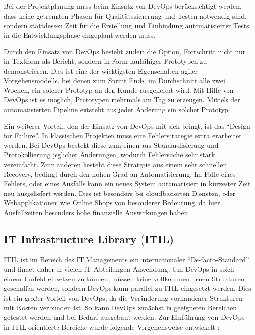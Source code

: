 Bei der Projektplanung muss beim Einsatz von DevOps berücksichtigt werden, dass keine getrennten Phasen für Qualitätssicherung und Testen notwendig sind, sondern stattdessen Zeit für die Erstellung und Einbindung automatisierter Tests in die Entwicklungsphase eingeplant werden muss. \parencite[Vgl.][S. 2]{Null:2014}

Durch den Einsatz von DevOps besteht zudem die Option, Fortschritt nicht nur in Textform als Bericht, sondern in Form lauffähiger Prototypen zu demonstrieren. 
Dies ist eine der wichtigsten Eigenschaften agiler Vorgehensmodelle, bei denen zum Sprint Ende, im Durchschnitt alle zwei Wochen, ein solcher Prototyp an den Kunde ausgeliefert wird. 
Mit Hilfe von DevOps ist es möglich, Prototypen mehrmals am Tag zu erzeugen. Mittels der automatisierten Pipeline entsteht aus jeder Änderung ein solcher Prototyp. \parencite[Vgl.][S. 3]{Null:2014}

Ein weiterer Vorteil, den der Einsatz von DevOps mit sich bringt, ist das \enquote{Design for Failure}. 
In klassischen Projekten muss eine Fehlerstrategie extra erarbeitet werden. Bei DevOps besteht diese zum einen aus Standardisierung und Protokollierung jeglicher Änderungen, wodurch Fehlersuche sehr stark vereinfacht. 
Zum anderen besteht diese Strategie aus einem sehr schnellen Recovery, bedingt durch den hohen Grad an Automatisierung. 
Im Falle eines Fehlers, oder eines Ausfalls kann ein neues System automatisiert in kürzester Zeit neu ausgeliefert werden. 
Dies ist besonders bei cloudbasierten Diensten, oder Webapplikationen wie Online Shops von besonderer Bedeutung, da hier Ausfallzeiten besonders hohe finanzielle Auswirkungen haben. 
\parencite[Vgl.][S. 3 - 4]{Null:2014}

\subsection{IT Infrastructure Library (ITIL)}
ITIL ist im Bereich des IT Managements ein internationaler \enquote{De-facto-Standard} und findet daher in vielen IT Abteilungen Anwendung. 
Um DevOps in solch einem Umfeld einsetzen zu können, müssen keine vollkommen neuen Strukturen geschaffen werden, sondern DevOps kann parallel zu ITIL eingesetzt werden. 
Dies ist ein großer Vorteil von DevOps, da die Veränderung vorhandener Strukturen mit Kosten verbunden ist. 
So kann DevOps zunächst in geeigneten Bereichen getestet werden und bei Bedarf ausgebaut werden.
Zur Einführung von DevOps in ITIL orientierte Bereiche wurde folgende Vorgehensweise entwickelt \parencite[vgl.][S. 1 - 3]{Sharp-Paul:2016}:

